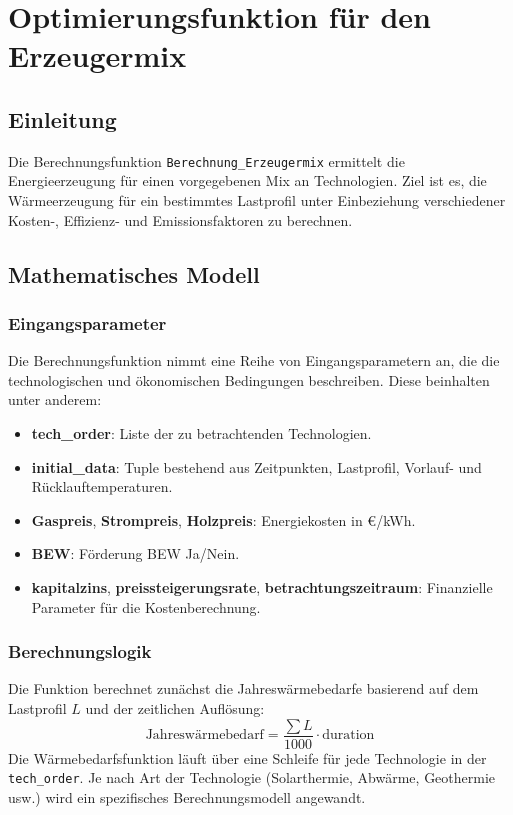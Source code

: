 \section{Optimierungsfunktion für den Erzeugermix}
\label{sec:calculate_mix_doc}

\subsection{Einleitung}
Die Berechnungsfunktion \texttt{Berechnung\_Erzeugermix} ermittelt die Energieerzeugung für einen vorgegebenen Mix an Technologien. Ziel ist es, die Wärmeerzeugung für ein bestimmtes Lastprofil unter Einbeziehung verschiedener Kosten-, Effizienz- und Emissionsfaktoren zu berechnen.

\subsection{Mathematisches Modell}
\subsubsection{Eingangsparameter}
Die Berechnungsfunktion nimmt eine Reihe von Eingangsparametern an, die die technologischen und ökonomischen Bedingungen beschreiben. Diese beinhalten unter anderem:

\begin{itemize}
    \item \textbf{tech\_order}: Liste der zu betrachtenden Technologien.
    \item \textbf{initial\_data}: Tuple bestehend aus Zeitpunkten, Lastprofil, Vorlauf- und Rücklauftemperaturen.
    \item \textbf{Gaspreis}, \textbf{Strompreis}, \textbf{Holzpreis}: Energiekosten in €/kWh.
    \item \textbf{BEW}: Förderung BEW Ja/Nein.
    \item \textbf{kapitalzins}, \textbf{preissteigerungsrate}, \textbf{betrachtungszeitraum}: Finanzielle Parameter für die Kostenberechnung.
\end{itemize}

\subsubsection{Berechnungslogik}
Die Funktion berechnet zunächst die Jahreswärmebedarfe basierend auf dem Lastprofil \( L \) und der zeitlichen Auflösung:
\[
\text{Jahreswärmebedarf} = \frac{\sum L}{1000} \cdot \text{duration}
\]
Die Wärmebedarfsfunktion läuft über eine Schleife für jede Technologie in der \texttt{tech\_order}. Je nach Art der Technologie (Solarthermie, Abwärme, Geothermie usw.) wird ein spezifisches Berechnungsmodell angewandt.

